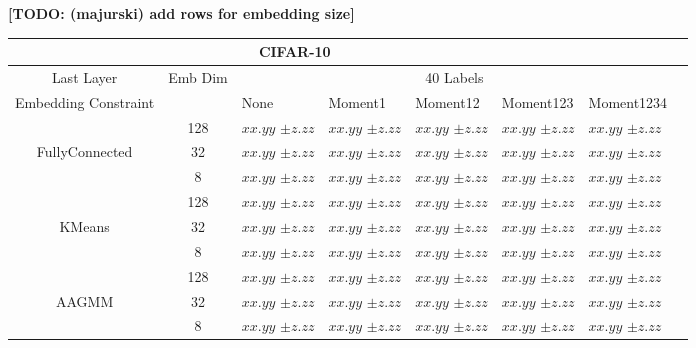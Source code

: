 \documentclass[10pt,twocolumn,letterpaper]{article}
\newcommand{\TODO}[1]{\textbf{\color{red}[TODO: #1]}}
\begin{document}
\TODO {(majurski) add rows for embedding size}
\begin{table*}[ht!]
	\begin{tabularx}{\textwidth}{c|c|XXXXXX}
		        \multicolumn{6}{c}{CIFAR-10} \\ \hline\hline
		 Last Layer &   Emb Dim   & \multicolumn{5}{c}{40 Labels}            \\ \hline
		Embedding Constraint  &  & None & Moment1 & Moment12 & Moment123 & Moment1234  \\ \hline
		 & 128  & $xx.yy$ \scriptsize{$\pm z.zz$}   & $xx.yy$ \scriptsize{$\pm z.zz$} & $xx.yy$ \scriptsize{$\pm z.zz$} & $xx.yy$ \scriptsize{$\pm z.zz$} & $xx.yy$ \scriptsize{$\pm z.zz$}  \\
		 FullyConnected & 32  & $xx.yy$ \scriptsize{$\pm z.zz$}   & $xx.yy$ \scriptsize{$\pm z.zz$} & $xx.yy$ \scriptsize{$\pm z.zz$} & $xx.yy$ \scriptsize{$\pm z.zz$} & $xx.yy$ \scriptsize{$\pm z.zz$}  \\
		  & 8  & $xx.yy$ \scriptsize{$\pm z.zz$}   & $xx.yy$ \scriptsize{$\pm z.zz$} & $xx.yy$ \scriptsize{$\pm z.zz$} & $xx.yy$ \scriptsize{$\pm z.zz$} & $xx.yy$ \scriptsize{$\pm z.zz$}  \\
		\hline
		 & 128  & $xx.yy$ \scriptsize{$\pm z.zz$}    & $xx.yy$ \scriptsize{$\pm z.zz$} & $xx.yy$ \scriptsize{$\pm z.zz$} & $xx.yy$ \scriptsize{$\pm z.zz$} & $xx.yy$ \scriptsize{$\pm z.zz$}  \\
		KMeans & 32  & $xx.yy$ \scriptsize{$\pm z.zz$}    & $xx.yy$ \scriptsize{$\pm z.zz$} & $xx.yy$ \scriptsize{$\pm z.zz$} & $xx.yy$ \scriptsize{$\pm z.zz$} & $xx.yy$ \scriptsize{$\pm z.zz$}  \\
		 & 8  & $xx.yy$ \scriptsize{$\pm z.zz$}    & $xx.yy$ \scriptsize{$\pm z.zz$} & $xx.yy$ \scriptsize{$\pm z.zz$} & $xx.yy$ \scriptsize{$\pm z.zz$} & $xx.yy$ \scriptsize{$\pm z.zz$}  \\
		\hline
		  & 128  & $xx.yy$ \scriptsize{$\pm z.zz$}    & $xx.yy$ \scriptsize{$\pm z.zz$} & $xx.yy$ \scriptsize{$\pm z.zz$} & $xx.yy$ \scriptsize{$\pm z.zz$} & $xx.yy$ \scriptsize{$\pm z.zz$} \\
		AAGMM  & 32  & $xx.yy$ \scriptsize{$\pm z.zz$}    & $xx.yy$ \scriptsize{$\pm z.zz$} & $xx.yy$ \scriptsize{$\pm z.zz$} & $xx.yy$ \scriptsize{$\pm z.zz$} & $xx.yy$ \scriptsize{$\pm z.zz$} \\
		  & 8  & $xx.yy$ \scriptsize{$\pm z.zz$}    & $xx.yy$ \scriptsize{$\pm z.zz$} & $xx.yy$ \scriptsize{$\pm z.zz$} & $xx.yy$ \scriptsize{$\pm z.zz$} & $xx.yy$ \scriptsize{$\pm z.zz$} \\

\end{tabularx}
\end{table*}
\end{document}
